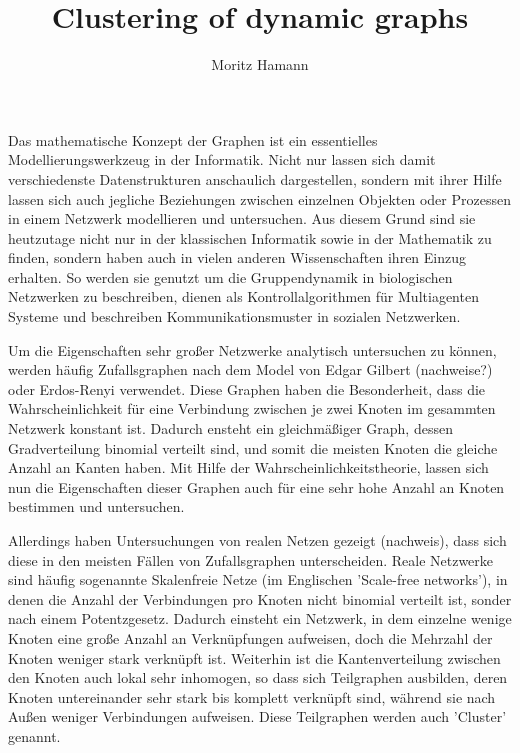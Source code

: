 \documentclass[journal]{vgtc}
\author{Moritz Hamann}
\title{Clustering of dynamic graphs}
\begin{document}

\maketitle

  Das mathematische Konzept der Graphen ist ein essentielles 
  Modellierungswerkzeug in der Informatik. Nicht nur lassen sich damit
  verschiedenste Datenstrukturen anschaulich dargestellen, sondern
  mit ihrer Hilfe lassen sich auch jegliche Beziehungen zwischen einzelnen
  Objekten oder Prozessen in einem Netzwerk modellieren und untersuchen.
  Aus diesem Grund sind sie heutzutage nicht nur in der klassischen Informatik
  sowie in der Mathematik zu finden, sondern haben auch in vielen anderen
  Wissenschaften ihren Einzug erhalten. So werden sie genutzt um die
  Gruppendynamik in biologischen Netzwerken zu beschreiben, dienen
  als Kontrollalgorithmen für Multiagenten Systeme \cite{graphcontrol} und beschreiben
  Kommunikationsmuster in sozialen Netzwerken.
  
  Um die Eigenschaften sehr großer Netzwerke analytisch untersuchen zu können,
  werden häufig Zufallsgraphen nach dem Model von Edgar Gilbert (nachweise?) oder
  Erdos-Renyi verwendet. Diese Graphen haben die Besonderheit, dass die 
  Wahrscheinlichkeit für eine Verbindung zwischen je zwei Knoten im 
  gesammten Netzwerk konstant ist. Dadurch ensteht ein gleichmäßiger Graph,
  dessen Gradverteilung binomial verteilt sind, und somit die meisten Knoten 
  die gleiche Anzahl an Kanten haben. Mit Hilfe der Wahrscheinlichkeitstheorie,
  lassen sich nun die Eigenschaften dieser Graphen auch für eine sehr hohe Anzahl
  an Knoten bestimmen und untersuchen.
  
  Allerdings haben Untersuchungen von realen Netzen gezeigt (nachweis), dass sich
  diese in den meisten Fällen von Zufallsgraphen unterscheiden. Reale Netzwerke sind
  häufig sogenannte Skalenfreie Netze (im Englischen 'Scale-free networks'), in 
  denen die Anzahl der Verbindungen pro Knoten nicht binomial verteilt ist, sonder nach einem
  Potentzgesetz. Dadurch einsteht ein Netzwerk, in dem einzelne wenige Knoten eine große
  Anzahl an Verknüpfungen aufweisen, doch die Mehrzahl der Knoten weniger stark verknüpft ist. 
  Weiterhin ist die Kantenverteilung zwischen den Knoten auch lokal sehr inhomogen, so dass sich 
  Teilgraphen ausbilden, deren Knoten untereinander sehr stark bis komplett verknüpft sind,
  während sie nach Außen weniger Verbindungen aufweisen. Diese Teilgraphen werden auch 'Cluster' genannt.
\end{document}
